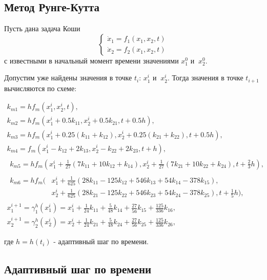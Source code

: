 \documentclass[a4paper,12pt]{article}
\begin{document}
\subsection*{Метод Рунге-Кутта}

Пусть дана задача Коши
\begin{equation*}
  \begin{cases} \dot{x}_1=f_1(x_1,x_2,t)\\ \dot{x}_2=f_2(x_1,x_2,t) \end{cases}
\end{equation*}
с известными в начальный момент времени значениями \(x_1^0\) и \(\ x_2^0\).

Допустим уже найдены значения в точке \(t_i\): \(x_1^{i}\) и \(\ x_2^{i}\). Тогда значения в точке \(t_{i+1}\) вычисляются по
схеме:

\begin{gather*}
  k_{m1}=h f_m(x_1^{i},x_2^{i}, t), \\ 
  k_{m2}=h f_m(x_1^{i} + 0.5 k_{11},x_2^{i} + 0.5 k_{21}, t + 0.5 h), \\ 
  k_{m3}=h f_m(x_1^{i} + 0.25 (k_{11}+k_{12}),x_2^{i} + 0.25 (k_{21}+k_{22}), t + 0.5 h),\\
  k_{m4}=f_m(x_1^{i} - k_{12} + 2 k_{13},x_2^{i} - k_{22} + 2 k_{23}, t + h),\\
  \begin{align*}
    k_{m5}=h f_m(x_1^{i} + \frac{1}{27}(7 k_{11}+10 k_{12}+k_{14}), x_2^{i} + \frac{1}{27}(7 k_{21}+10 k_{22}+k_{24}), t + \frac{2}{3} h),
  \end{align*} \\
  \begin{align*}
    k_{m6}=h f_m( & x_1^{i} + \frac{1}{625}(28 k_{11}-125 k_{12}+ 546 k_{13}+54 k_{14}-378 k_{15}),                      \\
                  & x_2^{i} + \frac{1}{625}(28 k_{21}-125 k_{22}+ 546 k_{23}+54 k_{24}-378 k_{25}), t + \frac{1}{5} h),
  \end{align*} \\
  x_1^{i+1}=\gamma_1^h(x_1^{i})=x_1^{i} + \frac{1}{24}k_{11} + \frac{5}{48} k_{14} + \frac{27}{56} k_{15} + \frac{125}{336} k_{16}, \\ 
  x_2^{i+1}=\gamma_2^h(x_2^{i})=x_2^{i} + \frac{1}{24}k_{21} + \frac{5}{48} k_{24} + \frac{27}{56} k_{25} + \frac{125}{336} k_{26},
\end{gather*}

где \(h=h(t_i)\) - адаптивный шаг по времени.

\subsection*{Адаптивный шаг по времени}
\end{document}
